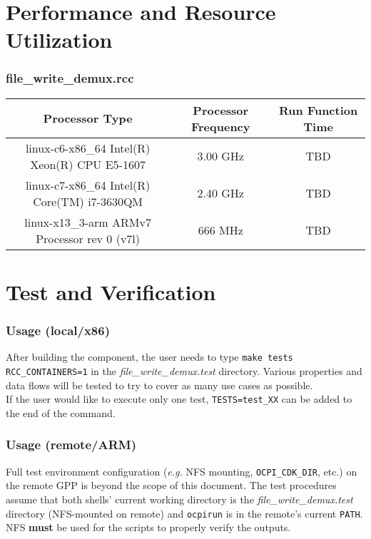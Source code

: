 \documentclass{article}
\def\comp{file\_write\_demux}
\begin{document}
\section*{Performance and Resource Utilization}

\subsubsection*{\comp.rcc}
\begin{scriptsize}
  \begin{tabular}{|c|c|c|}
    \hline
    \rowcolor{blue}
    Processor Type                                & Processor Frequency & Run Function Time \\
    \hline
    linux-c6-x86\_64 Intel(R) Xeon(R) CPU E5-1607 & 3.00 GHz            & TBD               \\
    \hline
    linux-c7-x86\_64 Intel(R) Core(TM) i7-3630QM  & 2.40 GHz            & TBD               \\
    \hline
    linux-x13\_3-arm ARMv7 Processor rev 0 (v7l)  & 666 MHz             & TBD               \\
    \hline
  \end{tabular}
\end{scriptsize}

\section*{Test and Verification}

\subsubsection*{Usage (local/x86)}
After building the component, the user needs to type \verb+make tests RCC_CONTAINERS=1+ in the \textit{file\_write\_demux.test} directory. Various properties and data flows will be tested to try to cover as many use cases as possible. \\

If the user would like to execute only one test, \verb+TESTS=test_XX+ can be added to the end of the command.

\subsubsection*{Usage (remote/ARM)}
Full test environment configuration (\textit{e.g.} NFS mounting, \verb+OCPI_CDK_DIR+, etc.) on the remote GPP is beyond the scope of this document. The test procedures assume that both shells' current working directory is the \textit{file\_write\_demux.test} directory (NFS-mounted on remote) and \verb+ocpirun+ is in the remote's current \verb+PATH+. NFS \textbf{must} be used for the scripts to properly verify the outputs. \\
\end{document}
